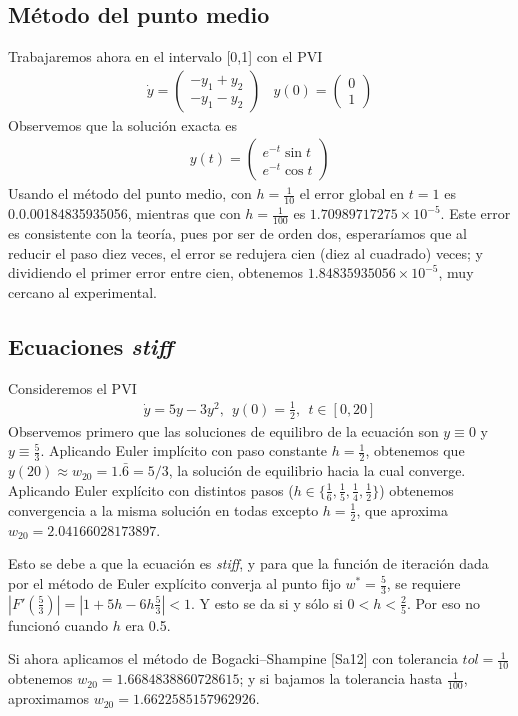 \documentclass[11pt]{article}
\begin{document}
\noindent
\subsection{Método del punto medio}
Trabajaremos ahora en el intervalo [0,1] con el PVI 
\begin{align*}
\dot{y} = \begin{pmatrix}
-y_1+y_2 \\
-y_1-y_2
\end{pmatrix}
\ \ \ \ y(0) = \begin{pmatrix}
0  \\ 1
\end{pmatrix}
\end{align*}
Observemos que la solución exacta es 
\begin{align*}
y(t) = \begin{pmatrix}
e^{-t}\sin t\\
e^{-t} \cos t
\end{pmatrix}
\end{align*}
Usando el método del punto medio, con $h = \frac{1}{10}$ el error global en $t=1$ es  
0.0.00184835935056, mientras que con $h = \frac{1}{100}$ es $1.70989717275 \times 	
10^{-5}.$ Este error es consistente con la teoría, pues por ser de orden dos,
esperaríamos que al reducir el paso diez veces, el error se redujera cien (diez al 
cuadrado) veces; y dividiendo el primer error entre cien, obtenemos $1.84835935056
\times 10^{-5}$, muy cercano al experimental.


\noindent
\subsection{Ecuaciones \textit{stiff}}
Consideremos el PVI
\begin{align*}
\dot{y} = 5y-3y^2, \ \ y(0) = \frac{1}{2}, \ \ t \in [0,20]
\end{align*}
Observemos primero que las soluciones de equilibro de la ecuación son $y \equiv 0$ y 
$y \equiv \frac{5}{3}$.
Aplicando Euler implícito con paso constante $h = \frac{1}{2}$, obtenemos que
$y(20) \approx w_{20} = 1.\bar{6} = 5/3$, la solución de equilibrio hacia
la cual converge.
Aplicando Euler explícito con distintos pasos ($h \in \{\frac{1}{6}, \frac{1}{5}, 
\frac{1}{4}, \frac{1}{2} \}$) obtenemos convergencia a la misma solución en todas
excepto $h = \frac{1}{2}$, que aproxima $w_{20} = 2.04166028173897$.

Esto se debe a que la ecuación es \textit{stiff}, y para que la función de iteración
dada por el método de Euler explícito converja al punto fijo $w^* = \frac{5}{3}$, se
requiere $|F'(\frac{5}{3})| = |1+5h-6h\frac{5}{3}|<1$. Y esto se da si y sólo si 
$0 < h < \frac{2}{5}$. Por eso no funcionó cuando $h$ era 0.5.

Si ahora aplicamos el método de Bogacki–Shampine [Sa12]  con tolerancia $tol = 
\frac{1}{10}$  obtenemos $w_{20} = 1.6684838860728615$; y si bajamos la tolerancia 
hasta  $\frac{1}{100}$, aproximamos $w_{20} = 1.6622585157962926$. 
\end{document}
